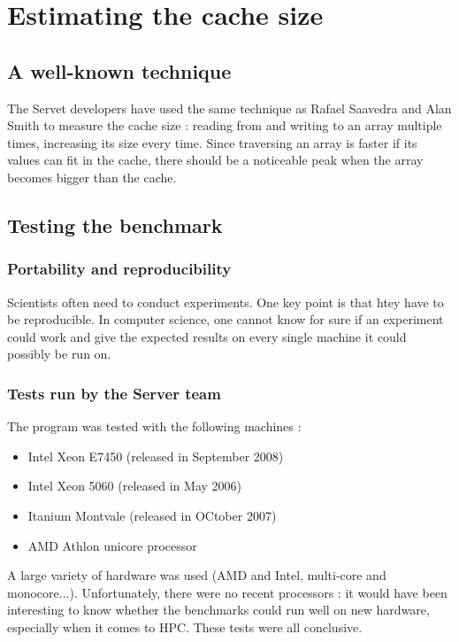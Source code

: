 \section{Estimating the cache size}

\subsection{A well-known technique}
The Servet developers have used the same technique as Rafael Saavedra and Alan
Smith\cite{Cache_TLB} to measure the cache size : reading from and writing to an
array multiple times, increasing its size every time. Since traversing an array
is faster if its values can fit in the cache, there should be a noticeable peak
when the array becomes bigger than the cache.

\subsection{Testing the benchmark}
\subsubsection{Portability and reproducibility}
Scientists often need to conduct experiments. One key point is that htey have to
be reproducible. In computer science, one cannot know for sure if an experiment
could work and give the expected results on every single machine it could
possibly be run on. 

\subsubsection{Tests run by the Server team}
The program was tested with the following machines :
    \begin{itemize}
        \item Intel Xeon E7450 (released in September 2008)
        \item Intel Xeon 5060 (released in May 2006)
        \item Itanium Montvale (released in OCtober 2007)
        \item AMD Athlon unicore processor
    \end{itemize}

A large variety of hardware was used (AMD and Intel, multi-core and
monocore...). Unfortunately, there were no recent processors : it would have
been interesting to know whether the benchmarks could run well on new hardware,
especially when it comes to HPC. These tests  were all conclusive.

